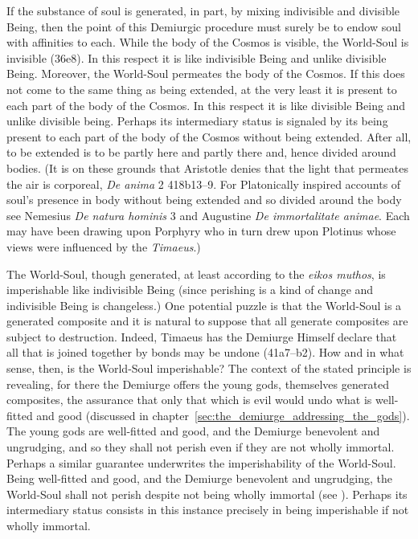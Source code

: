 If the substance of soul is generated, in part, by mixing indivisible and divisible Being, then the point of this Demiurgic procedure must surely be to endow soul with affinities to each. While the body of the Cosmos is visible, the World-Soul is invisible (36e8). In this respect it is like indivisible Being and unlike divisible Being. Moreover, the World-Soul permeates the body of the Cosmos. If this does not come to the same thing as being extended, at the very least it is present to each part of the body of the Cosmos. In this respect it is like divisible Being and unlike divisible being. Perhaps its intermediary status is signaled by its being present to each part of the body of the Cosmos without being extended. After all, to be extended is to be partly here and partly there and, hence divided around bodies. (It is on these grounds that Aristotle denies that the light that permeates the air is corporeal, \emph{De anima} 2 418b13--9. For Platonically inspired accounts of soul's presence in body without being extended and so divided around the body see Nemesius \emph{De natura hominis} 3 and Augustine \emph{De immortalitate animae}. Each may have been drawing upon Porphyry who in turn drew upon Plotinus whose views were influenced by the \emph{Timaeus}.) 

The World-Soul, though generated, at least according to the \emph{eikos muthos}, is imperishable like indivisible Being (since perishing is a kind of change and indivisible Being is changeless.) One potential puzzle is that the World-Soul is a generated composite and it is natural to suppose that all generate composites are subject to destruction. Indeed, Timaeus has the Demiurge Himself declare that all that is joined together by bonds may be undone (41a7--b2). How and in what sense, then, is the World-Soul imperishable? The context of the stated principle is revealing, for there the Demiurge offers the young gods, themselves generated composites, the assurance that only that which is evil would undo what is well-fitted and good (discussed in chapter~\ref{sec:the_demiurge_addressing_the_gods}). The young gods are well-fitted and good, and the Demiurge benevolent and ungrudging, and so they shall not perish even if they are not wholly immortal. Perhaps a similar guarantee underwrites the imperishability of the World-Soul. Being well-fitted and good, and the Demiurge benevolent and ungrudging, the World-Soul shall not perish despite not being wholly immortal (see \citealt{Betegh:2019fq}). Perhaps its intermediary status consists in this instance precisely in being imperishable if not wholly immortal. 

